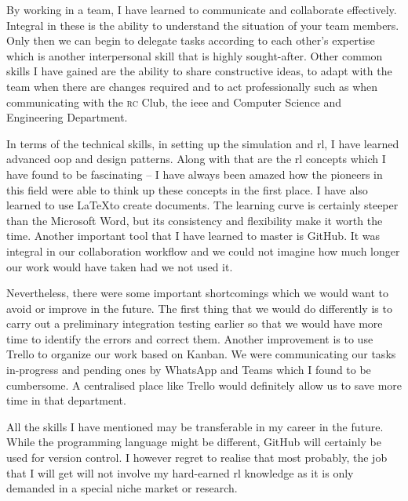 \documentclass[../main.tex]{subfiles}
\begin{document}
By working in a team, I have learned to communicate and collaborate
effectively.
Integral in these is the ability to understand the situation of your
team members.
Only then we can begin to delegate tasks according to each other's
expertise which is another interpersonal skill that is highly
sought-after.
Other common skills I have gained are the ability to share
constructive ideas, to adapt with the team when there are changes
required and to act professionally such as when communicating with the
\textsc{rc} Club, the \gls{ieee} and Computer Science and Engineering
Department.

In terms of the technical skills, in setting up the simulation and
\gls{rl}, I have learned advanced \gls{oop} and design patterns.  
Along with that are the \gls{rl} concepts which I have found to be
fascinating -- I have always been amazed how the pioneers in this
field were able to think up these concepts in the first place.
I have also learned to use \LaTeX to create documents.
The learning curve is certainly steeper than the Microsoft Word, but
its consistency and flexibility make it worth the time.
Another important tool that I have learned to master is GitHub.
It was integral in our collaboration workflow and we could not imagine
how much longer our work would have taken had we not used it.

Nevertheless, there were some important shortcomings which we would
want to avoid or improve in the future.
The first thing that we would do differently is to carry out a
preliminary integration testing earlier so that we would have more time
to identify the errors and correct them.
Another improvement is to use Trello to organize our work based on
Kanban.
We were communicating our tasks in-progress and pending ones by
WhatsApp and Teams which I found to be cumbersome. 
A centralised place like Trello would definitely allow us to save more
time in that department.

All the skills I have mentioned may be transferable in my career in the
future.
While the programming language might be different, GitHub will certainly
be used for version control.
I however regret to realise that most probably, the job that I will
get will not involve my hard-earned \gls{rl} knowledge as it is only
demanded in a special niche market or research.
\end{document}
